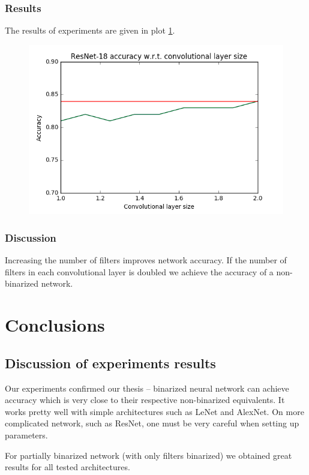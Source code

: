 \documentclass[licencjacka]{pracamgr}
\begin{document}
		\subsection{Results}
		 The results of experiments are given in plot \ref{plot:1}.
		\begin{figure}[h]
				\centering
				\includegraphics[width=\textwidth]{images/filter-ratio}
				\caption{}
				\label{plot:1}
			\end{figure}
		\subsection{Discussion}
			Increasing the number of filters improves network accuracy. If the number of filters in each convolutional layer is doubled we achieve the accuracy of a non-binarized network.

\chapter{Conclusions}
	\section{Discussion of experiments results}
		Our experiments confirmed our thesis -- binarized neural network can achieve accuracy which is very close to their respective non-binarized equivalents. It works pretty well with simple architectures such as LeNet and AlexNet. On more complicated network, such as ResNet, one must be very careful when setting up parameters. 
	
		For partially binarized network (with only filters binarized) we obtained great results for all tested architectures.
		
\end{document}
